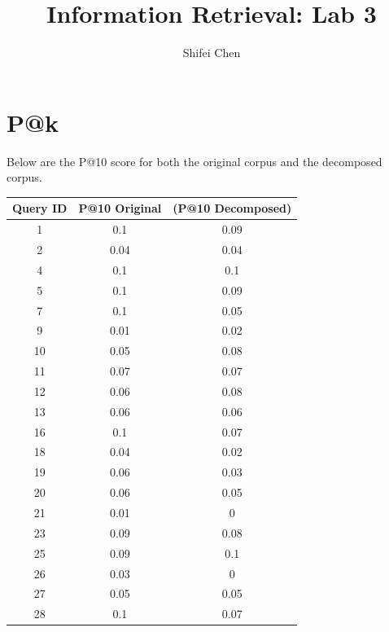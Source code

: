\documentclass[11pt]{article} %
\title{{\LARGE Information Retrieval: Lab 3}\\[1.5mm]} %
\author{Shifei Chen} %
\begin{document}
\maketitle

\section{P@k}

Below are the P@10 score for both the original corpus and the decomposed corpus.

\begin{table}[h]
    \begin{center}
        \begin{tabular}{c|c|c|}
            \textbf{Query ID} & \textbf{P@10 Original} & \textbf(P@10 Decomposed) \\
            \hline
            1   & 0.1               & 0.09 \\
            2   & 0.04              & 0.04 \\
            4   & 0.1               & 0.1  \\
            5   & 0.1               & 0.09 \\
            7   & 0.1               & 0.05 \\
            9   & 0.01              & 0.02 \\
            10  & 0.05              & 0.08 \\
            11  & 0.07              & 0.07 \\
            12  & 0.06              & 0.08 \\
            13  & 0.06              & 0.06 \\
            16  & 0.1               & 0.07 \\
            18  & 0.04              & 0.02 \\
            19  & 0.06              & 0.03 \\
            20  & 0.06              & 0.05 \\
            21  & 0.01              & 0    \\
            23  & 0.09              & 0.08 \\
            25  & 0.09              & 0.1  \\
            26  & 0.03              & 0    \\
            27  & 0.05              & 0.05 \\
            28  & 0.1               & 0.07 \\

\end{tabular}
\end{center}
\end{table}
\end{document}
